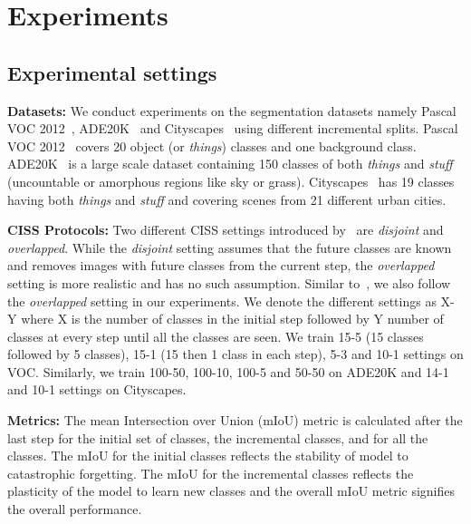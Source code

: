 
\section{Experiments}

\subsection{Experimental settings}

\noindent\textbf{Datasets:}
We conduct experiments on the segmentation datasets namely Pascal VOC 2012~\cite{everingham2015pascal}, ADE20K~\cite{zhou2017scene} and Cityscapes~\cite{cordts2016cityscapes} using different incremental splits. Pascal VOC 2012~\cite{everingham2015pascal} covers 20 object (or \emph{things}) classes and one background class. ADE20K~\cite{zhou2017scene} is a large scale dataset containing 150 classes of both \emph{things} and \emph{stuff} (uncountable or amorphous regions like sky or grass). Cityscapes~\cite{cordts2016cityscapes} has 19 classes having both \emph{things} and \emph{stuff} and covering scenes from 21 different urban cities.

\noindent\textbf{CISS Protocols:} Two different CISS settings introduced by~\cite{cermelli2020modeling} are \emph{disjoint} and \emph{overlapped}. While the \emph{disjoint} setting assumes that the future classes are known and removes images with future classes from the current step, the \emph{overlapped} setting is more realistic and has no such assumption. Similar to~\cite{douillard2021plop, cha2021ssul}, we also follow the \emph{overlapped} setting in our experiments. We denote the different settings as X-Y where X is the number of classes in the initial step followed by Y number of classes at every step until all the classes are seen. We train 15-5 (15 classes followed by 5 classes), 15-1 (15 then 1 class in each step), 5-3 and 10-1 settings on VOC. Similarly, we train 100-50, 100-10, 100-5 and 50-50 on ADE20K and 14-1 and 10-1 settings on Cityscapes.

\noindent\textbf{Metrics:}
The mean Intersection over Union (mIoU) metric is calculated after the last step for the initial set of classes, the incremental classes, and for all the classes. The mIoU for the initial classes reflects the stability of model to catastrophic forgetting. The mIoU for the incremental classes reflects the plasticity of the model to learn new classes and the overall mIoU metric signifies the overall performance.

